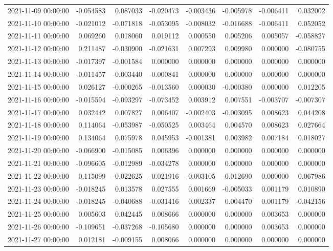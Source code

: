 \begin{tabular}{lrrrrrrr}
2021-11-09 00:00:00 & -0.054583 & 0.087033 & -0.020473 & -0.003436 & -0.005978 & -0.006411 & 0.032002 \\
2021-11-10 00:00:00 & -0.021012 & -0.071818 & -0.053095 & -0.008032 & -0.016688 & -0.006411 & 0.052052 \\
2021-11-11 00:00:00 & 0.069260 & 0.018060 & 0.019112 & 0.000550 & 0.005206 & 0.005057 & -0.058827 \\
2021-11-12 00:00:00 & 0.211487 & -0.030900 & -0.021631 & 0.007293 & 0.009980 & 0.000000 & -0.080755 \\
2021-11-13 00:00:00 & -0.017397 & -0.001584 & 0.000000 & 0.000000 & 0.000000 & 0.000000 & 0.000000 \\
2021-11-14 00:00:00 & -0.011457 & -0.003440 & -0.000841 & 0.000000 & 0.000000 & 0.000000 & 0.000000 \\
2021-11-15 00:00:00 & 0.026127 & -0.000265 & -0.013560 & 0.000030 & -0.000380 & 0.000000 & 0.012205 \\
2021-11-16 00:00:00 & -0.015594 & -0.093297 & -0.073452 & 0.003912 & 0.007551 & -0.003707 & -0.007307 \\
2021-11-17 00:00:00 & 0.032442 & 0.007827 & 0.006407 & -0.002403 & -0.003095 & 0.008623 & 0.044208 \\
2021-11-18 00:00:00 & 0.114064 & -0.053987 & -0.050525 & 0.003464 & 0.004570 & 0.008623 & 0.027664 \\
2021-11-19 00:00:00 & 0.134064 & 0.075978 & 0.045953 & -0.001381 & 0.003982 & 0.007184 & 0.018027 \\
2021-11-20 00:00:00 & -0.066900 & -0.015085 & 0.006396 & 0.000000 & 0.000000 & 0.000000 & 0.000000 \\
2021-11-21 00:00:00 & -0.096605 & -0.012989 & -0.034278 & 0.000000 & 0.000000 & 0.000000 & 0.000000 \\
2021-11-22 00:00:00 & 0.115099 & -0.022625 & -0.021916 & -0.003105 & -0.012690 & 0.000000 & 0.067986 \\
2021-11-23 00:00:00 & -0.018245 & 0.013578 & 0.027555 & 0.001669 & -0.005033 & 0.001179 & 0.010890 \\
2021-11-24 00:00:00 & -0.018245 & -0.040688 & -0.031416 & 0.002337 & 0.004470 & 0.001179 & -0.042156 \\
2021-11-25 00:00:00 & 0.005603 & 0.042445 & 0.008666 & 0.000000 & 0.000000 & 0.003653 & 0.000000 \\
2021-11-26 00:00:00 & -0.109651 & -0.037268 & -0.105680 & 0.000000 & 0.000000 & 0.003653 & 0.000000 \\
2021-11-27 00:00:00 & 0.012181 & -0.009155 & 0.008066 & 0.000000 & 0.000000 & 0.000000 & 0.000000 \\

\end{tabular}
